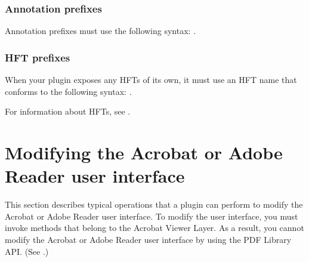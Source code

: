 \documentclass[letterpaper,12pt,english,openany,oneside]{sphinxmanual}
\begin{document}
\subsubsection{Annotation prefixes}
\label{\detokenize{Plugins_Pimech:annotation-prefixes}}
Annotation prefixes must use the following syntax: .

\begin{sphinxVerbatim}[commandchars=\\\{\}]
\end{sphinxVerbatim}


\subsubsection{HFT prefixes}
\label{\detokenize{Plugins_Pimech:hft-prefixes}}
When your plugin exposes any HFTs of its own, it must use an HFT name that conforms to the following syntax: .

\begin{sphinxVerbatim}[commandchars=\\\{\}]
 
   
\end{sphinxVerbatim}

For information about HFTs, see .


\section{Modifying the Acrobat or Adobe Reader user interface}
\label{\detokenize{Plugins_Pimech:modifying-the-acrobat-or-adobe-reader-user-interface}}
This section describes typical operations that a plugin can perform to modify the Acrobat or Adobe Reader user interface. To modify the user interface, you must invoke methods that belong to the Acrobat Viewer Layer. As a result, you cannot modify the Acrobat or Adobe Reader user interface by using the PDF Library API. (See .)
\end{document}

